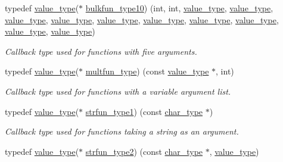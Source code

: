 \begin{DoxyCompactItemize}
typedef \hyperlink{namespacemu_a17d4f113a4b88b8d971cca8ddbbe8a47}{value\+\_\+type}($\ast$ \hyperlink{namespacemu_aebd99bafbd17761a9e13b8a7366ae1ce}{bulkfun\+\_\+type10}) (int, int, \hyperlink{namespacemu_a17d4f113a4b88b8d971cca8ddbbe8a47}{value\+\_\+type}, \hyperlink{namespacemu_a17d4f113a4b88b8d971cca8ddbbe8a47}{value\+\_\+type}, \hyperlink{namespacemu_a17d4f113a4b88b8d971cca8ddbbe8a47}{value\+\_\+type}, \hyperlink{namespacemu_a17d4f113a4b88b8d971cca8ddbbe8a47}{value\+\_\+type}, \hyperlink{namespacemu_a17d4f113a4b88b8d971cca8ddbbe8a47}{value\+\_\+type}, \hyperlink{namespacemu_a17d4f113a4b88b8d971cca8ddbbe8a47}{value\+\_\+type}, \hyperlink{namespacemu_a17d4f113a4b88b8d971cca8ddbbe8a47}{value\+\_\+type}, \hyperlink{namespacemu_a17d4f113a4b88b8d971cca8ddbbe8a47}{value\+\_\+type}, \hyperlink{namespacemu_a17d4f113a4b88b8d971cca8ddbbe8a47}{value\+\_\+type}, \hyperlink{namespacemu_a17d4f113a4b88b8d971cca8ddbbe8a47}{value\+\_\+type})
\begin{DoxyCompactList}\small\item\em Callback type used for functions with five arguments. \end{DoxyCompactList}\item 
typedef \hyperlink{namespacemu_a17d4f113a4b88b8d971cca8ddbbe8a47}{value\+\_\+type}($\ast$ \hyperlink{namespacemu_a004a9a10d015a8e2e17604cb632cd6c1}{multfun\+\_\+type}) (const \hyperlink{namespacemu_a17d4f113a4b88b8d971cca8ddbbe8a47}{value\+\_\+type} $\ast$, int)
\begin{DoxyCompactList}\small\item\em Callback type used for functions with a variable argument list. \end{DoxyCompactList}\item 
typedef \hyperlink{namespacemu_a17d4f113a4b88b8d971cca8ddbbe8a47}{value\+\_\+type}($\ast$ \hyperlink{namespacemu_a578b844842f577e78da3f520f9ee2f9a}{strfun\+\_\+type1}) (const \hyperlink{namespacemu_a81cc89a81a8872430ab1799b5848c5ca}{char\+\_\+type} $\ast$)
\begin{DoxyCompactList}\small\item\em Callback type used for functions taking a string as an argument. \end{DoxyCompactList}\item 
typedef \hyperlink{namespacemu_a17d4f113a4b88b8d971cca8ddbbe8a47}{value\+\_\+type}($\ast$ \hyperlink{namespacemu_a14b9af8ec1e328b685221ca23fc9f765}{strfun\+\_\+type2}) (const \hyperlink{namespacemu_a81cc89a81a8872430ab1799b5848c5ca}{char\+\_\+type} $\ast$, \hyperlink{namespacemu_a17d4f113a4b88b8d971cca8ddbbe8a47}{value\+\_\+type})

\end{DoxyCompactItemize}
